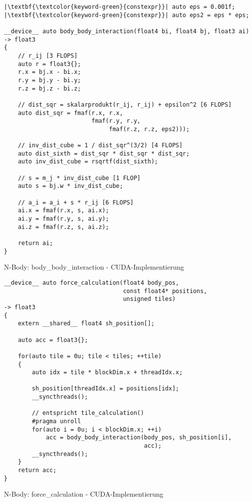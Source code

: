 \begin{code}
    \begin{verbatim}
|\textbf{\textcolor{keyword-green}{constexpr}}| auto eps = 0.001f;
|\textbf{\textcolor{keyword-green}{constexpr}}| auto eps2 = eps * eps;

__device__ auto body_body_interaction(float4 bi, float4 bj, float3 ai)
-> float3
{
    // r_ij [3 FLOPS]
    auto r = float3{};
    r.x = bj.x - bi.x;
    r.y = bj.y - bi.y;
    r.z = bj.z - bi.z;

    // dist_sqr = skalarprodukt(r_ij, r_ij) + epsilon^2 [6 FLOPS]
    auto dist_sqr = fmaf(r.x, r.x,
                         fmaf(r.y, r.y,
                              fmaf(r.z, r.z, eps2)));

    // inv_dist_cube = 1 / dist_sqr^(3/2) [4 FLOPS]
    auto dist_sixth = dist_sqr * dist_sqr * dist_sqr;
    auto inv_dist_cube = rsqrtf(dist_sixth);

    // s = m_j * inv_dist_cube [1 FLOP]
    auto s = bj.w * inv_dist_cube;

    // a_i = a_i + s * r_ij [6 FLOPS]
    ai.x = fmaf(r.x, s, ai.x);
    ai.y = fmaf(r.y, s, ai.y);
    ai.z = fmaf(r.z, s, ai.z);

    return ai;
}
    \end{verbatim}
    \caption{N-Body: body\_body\_interaction - CUDA-Implementierung}
    \label{anhang:cuda:bodybodyinteraction}
\end{code}

\begin{code}
    \begin{verbatim}
__device__ auto force_calculation(float4 body_pos,
                                  const float4* positions,
                                  unsigned tiles)
-> float3
{
    extern __shared__ float4 sh_position[];

    auto acc = float3{};

    for(auto tile = 0u; tile < tiles; ++tile)
    {
        auto idx = tile * blockDim.x + threadIdx.x;

        sh_position[threadIdx.x] = positions[idx];
        __syncthreads();

        // entspricht tile_calculation()
        #pragma unroll
        for(auto i = 0u; i < blockDim.x; ++i)
            acc = body_body_interaction(body_pos, sh_position[i],
                                        acc);
        __syncthreads();
    }
    return acc;
}
    \end{verbatim}
    \caption{N-Body: force\_calculation - CUDA-Implementierung}
    \label{anhang:cuda:forcecalculation}
\end{code}

